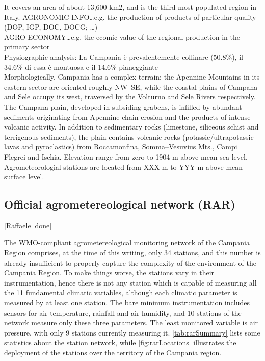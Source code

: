 \documentclass[authoryear,preprint,review,12pt]{elsarticle}
\begin{document}
    It covers an area of about 13,600 km2, and is the third most populated region in Italy.
    AGRONOMIC INFO\dots e.g. the production of products of particular quality (DOP, IGP, DOC, DOCG; \dots)\\
    AGRO-ECONOMY\dots e.g. the ecomic value of the regional production in the primary sector\\
    Physiographic analysis: La Campania è prevalentemente collinare (50.8\%), il 34.6\% di essa è montuosa e il 14.6\% pianeggiante\\
    
    Morphologically, Campania has a complex terrain: the Apennine Mountains in its eastern sector are oriented roughly NW–SE, while the coastal plains of Campana and Sele occupy its west, traversed by the Volturno and Sele Rivers respectively.
    The Campana plain, developed in subsiding grabens, is infilled by abundant sediments originating from Apennine chain erosion and the products of intense volcanic activity.
    In addition to sedimentary rocks (limestone, siliceous schist and terrigenous sediments), the plain contains volcanic rocks (potassic/ultrapotassic lavas and pyroclastics) from Roccamonfina, Somma–Vesuvius Mts., Campi Flegrei and Ischia.
    Elevation range from zero to 1904 m above mean sea level.
    Agrometeorologial stations are located from XXX m to YYY m above mean surface level.

\subsection{Official agrometereological network (RAR)\label{RARStructure}}[Raffaele][done]

The WMO-compliant agrometereological monitoring network of the Campania Region comprises, at the time of this writing, only 34 stations, and this number is already insufficient to properly capture the complexity of the environment of the Campania Region. To make things worse, the stations vary in their instrumentation, hence there is not any station which is capable of measuring all the 11 fundamental climatic variables, although each climatic parameter is measured by at least one station. The bare minimum instrumentation includes sensors for air temperature, rainfall and air humidity, and 10 stations of the network measure only these three parameters. The least monitored variable is air pressure, with only 9 stations currently measuring it. \cref{tab:rarSummary} lists some statistics about the station network, while \cref{fig:rarLocations} illustrates the deployment of the stations over the territory of the Campania region.
\end{document}
